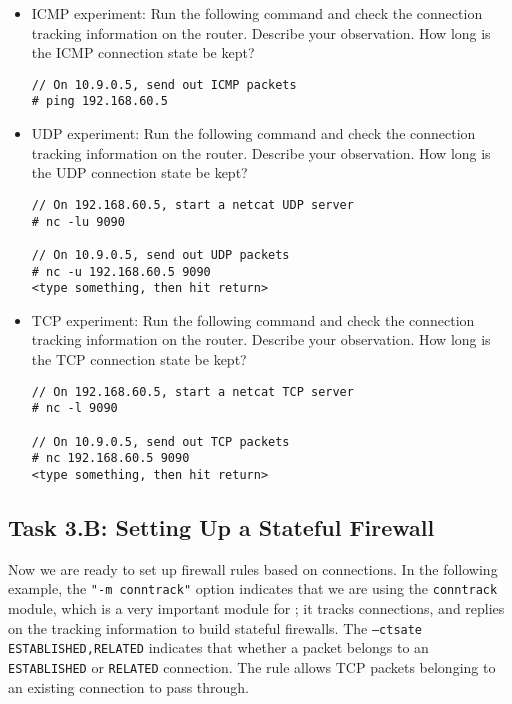 \begin{itemize}
\item ICMP experiment: Run the following command and 
check the connection tracking information on the router. Describe
your observation. How long is the ICMP connection state be kept? 

\begin{lstlisting}
// On 10.9.0.5, send out ICMP packets
# ping 192.168.60.5
\end{lstlisting}

\item UDP experiment: Run the following command and 
check the connection tracking information on the router. Describe
your observation. How long is the UDP connection state be kept? 


\begin{lstlisting}
// On 192.168.60.5, start a netcat UDP server
# nc -lu 9090

// On 10.9.0.5, send out UDP packets  
# nc -u 192.168.60.5 9090
<type something, then hit return>
\end{lstlisting}


\item TCP experiment: Run the following command and 
check the connection tracking information on the router. Describe
your observation. How long is the TCP connection state be kept? 

\begin{lstlisting}
// On 192.168.60.5, start a netcat TCP server
# nc -l 9090

// On 10.9.0.5, send out TCP packets 
# nc 192.168.60.5 9090
<type something, then hit return>
\end{lstlisting}

\end{itemize}
 


\subsection{Task 3.B: Setting Up a Stateful Firewall} 


Now we are ready to set up firewall rules based on connections. 
In the following example, 
the \texttt{"-m conntrack"} option indicates that we are using the \texttt{conntrack} module,
which is a very important module for \iptables; it tracks connections, and
\iptables replies on the tracking information to build stateful firewalls. 
The \texttt{--ctsate ESTABLISHED,RELATED} indicates that whether a packet
belongs to an \texttt{ESTABLISHED} or \texttt{RELATED} connection.
The rule allows TCP packets belonging to an existing connection to 
pass through. 

